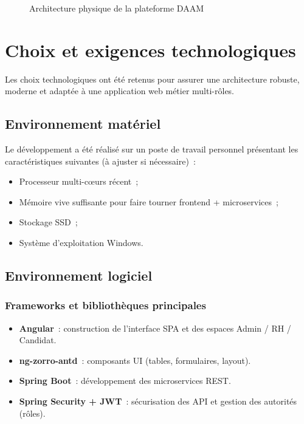 \begin{figure}[htbp]
  \centering
  \caption{Architecture physique de la plateforme DAAM}
  \label{fig:arch-physical}
\end{figure}

\section{Choix et exigences technologiques}

Les choix technologiques ont été retenus pour assurer une architecture robuste,
moderne et adaptée à une application web métier multi-rôles.


\subsection{Environnement matériel}

Le développement a été réalisé sur un poste de travail personnel présentant les
caractéristiques suivantes (à ajuster si nécessaire)~:
\begin{itemize}
  \item Processeur multi-cœurs récent~;
  \item Mémoire vive suffisante pour faire tourner frontend + microservices~;
  \item Stockage SSD~;
  \item Système d'exploitation Windows.
\end{itemize}


\subsection{Environnement logiciel}

\subsubsection{Frameworks et bibliothèques principales}

\begin{itemize}
  \item \textbf{Angular}~: construction de l'interface SPA et des espaces Admin /
        RH / Candidat.
  \item \textbf{ng-zorro-antd}~: composants UI (tables, formulaires, layout).
  \item \textbf{Spring Boot}~: développement des microservices REST.
  \item \textbf{Spring Security + JWT}~: sécurisation des API et gestion des
        autorités (rôles).
\end{itemize}


